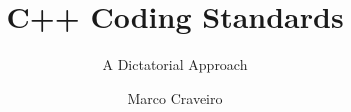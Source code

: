 \documentclass[graybox,envcountchap,sectrefs]{svmono}
\begin{document}
\author{Marco Craveiro}
\title{C++ Coding Standards}
\subtitle{A Dictatorial Approach}
\maketitle

\frontmatter






\tableofcontents



\mainmatter




\backmatter


\printindex
\end{document}
